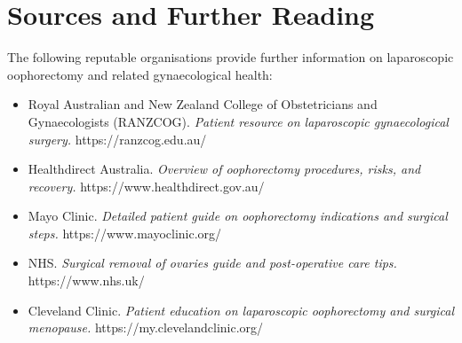 \section*{Sources and Further Reading}
The following reputable organisations provide further information on laparoscopic oophorectomy and related gynaecological health:
\begin{itemize}
    \item Royal Australian and New Zealand College of Obstetricians and Gynaecologists (RANZCOG). \textit{Patient resource on laparoscopic gynaecological surgery.} https://ranzcog.edu.au/
    \item Healthdirect Australia. \textit{Overview of oophorectomy procedures, risks, and recovery.} https://www.healthdirect.gov.au/
    \item Mayo Clinic. \textit{Detailed patient guide on oophorectomy indications and surgical steps.} https://www.mayoclinic.org/
    \item NHS. \textit{Surgical removal of ovaries guide and post-operative care tips.} https://www.nhs.uk/
    \item Cleveland Clinic. \textit{Patient education on laparoscopic oophorectomy and surgical menopause.} https://my.clevelandclinic.org/
\end{itemize}
